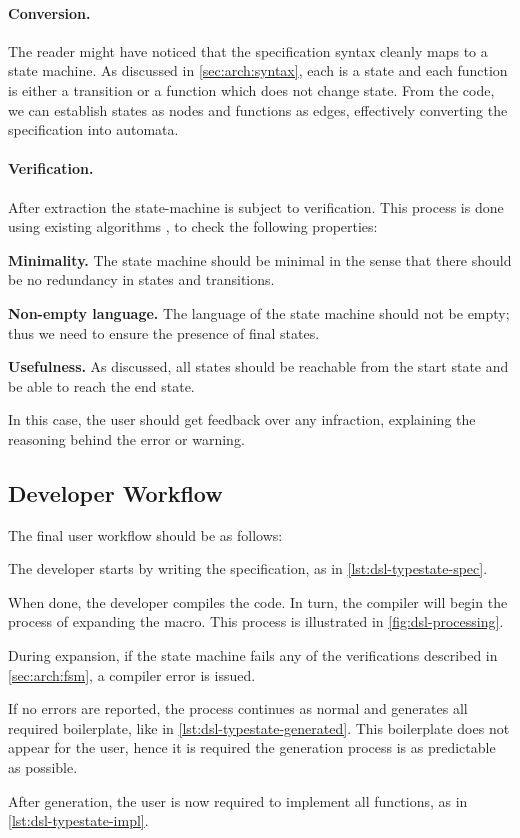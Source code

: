 \paragraph{Conversion.}
The reader might have noticed that the specification syntax cleanly maps to a state machine.
As discussed in \autoref{sec:arch:syntax}, each  is a state and each function is either a transition or a function which does not change state.
From the code, we can establish states as nodes and functions as edges,
effectively converting the specification into automata.

\paragraph{Verification.}
After extraction the state-machine is subject to verification.
This process is done using existing algorithms \autocite{Hopcroft2013}, to check the following properties:
\begin{compactitem}
    \item \textbf{Minimality.} The state machine should be minimal in the sense that there should be no redundancy in states and transitions.
    \item \textbf{Non-empty language.} The language of the state machine should not be empty; thus we need to ensure the presence of final states.
    \item \textbf{Usefulness.} As discussed, all states should be reachable from the start state and be able to reach the end state.
\end{compactitem}
In this case, the user should get feedback over any infraction,
explaining the reasoning behind the error or warning.

\subsection{Developer Workflow}
The final user workflow should be as follows:
\begin{compactenum}
    \item The developer starts by writing the specification, as in \autoref{lst:dsl-typestate-spec}.
    \item When done, the developer compiles the code.
    In turn, the compiler will begin the process of expanding the macro.
    This process is illustrated in \autoref{fig:dsl-processing}.
    \begin{compactitem}
        \item During expansion, if the state machine fails any of the verifications described in \autoref{sec:arch:fsm},
        a compiler error is issued.
        \item If no errors are reported, the process continues as normal and generates all required boilerplate, like in \autoref{lst:dsl-typestate-generated}.
        This boilerplate does not appear for the user, hence it is required the generation process is as predictable as possible.
    \end{compactitem}
    \item After generation, the user is now required to implement all functions, as in \autoref{lst:dsl-typestate-impl}.
\end{compactenum}


